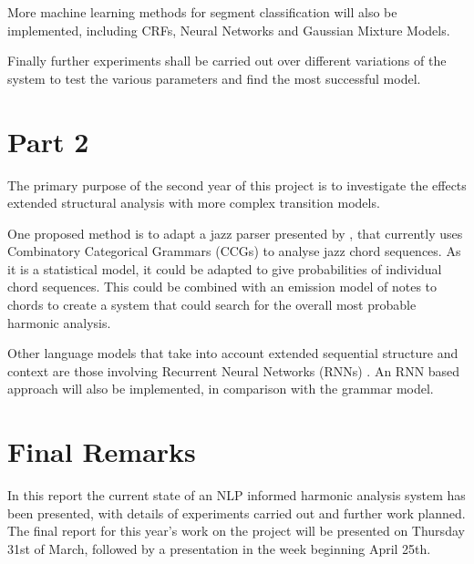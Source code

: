 \documentclass[bsc,singlespacing,parskip,deptreport]{infthesis}
\begin{document}
More machine learning methods for segment classification will also be implemented, including CRFs, Neural Networks and Gaussian Mixture Models.

Finally further experiments shall be carried out over different variations of the system to test the various parameters and find the most successful model.

\section{Part 2}

The primary purpose of the second year of this project is to investigate the effects extended structural analysis with more complex transition models.

One proposed method is to adapt a jazz parser presented by \cite{ccg}, that currently uses Combinatory Categorical Grammars (CCGs) to analyse jazz chord sequences. As it is a statistical model, it could be adapted to give probabilities of individual chord sequences. This could be combined with an emission model of notes to chords to create a system that could search for the overall most probable harmonic analysis.

Other language models that take into account extended sequential structure and context are those involving Recurrent Neural Networks (RNNs) \cite{rnn}. An RNN based approach will also be implemented, in comparison with the grammar model.

\section{Final Remarks}

In this report the current state of an NLP informed harmonic analysis system has been presented, with details of experiments carried out and further work planned. The final report for this year's work on the project will be presented on Thursday 31st of March, followed by a presentation in the week beginning April 25th.
\end{document}
